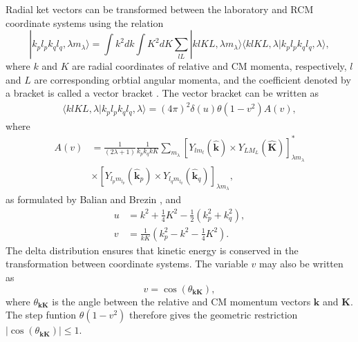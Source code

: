 \documentclass[a4paper,12pt]{report}
\begin{document}
Radial ket vectors can be transformed between the laboratory 
and RCM coordinate systems using the relation \cite{wong1972} 
\begin{equation} \label{eq:labRCM}
  |k_{p}l_{p}k_{q}l_{q},\lambda m_{\lambda }\rangle =
  \int k^{2} dk \int K^{2} dK 
  \sum_{lL}|klKL,\lambda m_{\lambda } \rangle
  \langle klKL,\lambda |k_{p}l_{p}k_{q}l_{q},\lambda \rangle ,
\end{equation}
where $k$ and $K$ are radial coordinates of relative and 
CM momenta, respectively, $l$ and $L$ are corresponding
orbtial angular momenta, and the coefficient denoted by
a bracket is called a vector bracket \cite{wong1972,kung1979}. 
The vector bracket can be written as
\begin{align} \label{eq:vb}
  \langle klKL,\lambda |k_{p}l_{p}k_{q}l_{q},\lambda \rangle 
  = \left( 4\pi \right)^{2} \delta(u)\theta(1-v^{2})A(v),
\end{align}
where 
\begin{align}
  A(v)&=\frac{1}{(2\lambda +1)}\frac{1}{k_{p}k_{q}kK}
  \sum_{m_{\lambda } }\left[ Y_{lm_{l}}(\mathbf{\hat{k}})
    \times Y_{LM_{L}}(\mathbf{\hat{K}})\right]_{\lambda m_{\lambda }}^{*} 
  \nonumber \\
  & \times \left[ Y_{l_{p}m_{l_{p}}}(\mathbf{\hat{k}}_{p})
    \times Y_{l_{q}m_{l_{q}}}(\mathbf{\hat{k}}_{q})\right]_{\lambda m_{\lambda }},
\end{align}
as formulated by Balian and Brezin \cite{wong1972, balian1969}, 
and 
\begin{align}\label{eq:v_theta}
  u&=k^{2}+\frac{1}{4}K^{2}-\frac{1}{2}(k_{p}^{2}+k_{q}^{2}), \\
  v&=\frac{1}{kK}\left( k_{p}^{2}-k^{2}-\frac{1}{4}K^{2} \right). 
\end{align}
The delta distribution ensures that kinetic energy is conserved 
in the transformation between coordinate systems. The variable 
$v$ may also be written as
\[
v = \cos(\theta_{\mathbf{k}\mathbf{K}}),
\] 
where $\theta_{\mathbf{k}\mathbf{K}}$ is the angle between the 
relative and CM momentum vectors $\mathbf{k}$ 
and $\mathbf{K}$. The step funtion $\theta(1-v^{2})$ therefore 
gives the geometric restriction 
$|\cos(\theta_{\mathbf{k}\mathbf{K}})| \leq 1$. 
\end{document}
